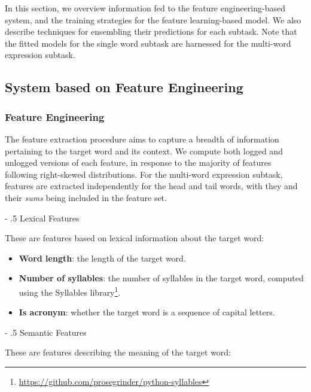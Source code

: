 \documentclass[11pt,a4paper]{article}
\makeatletter
\renewcommand\paragraph{%
    \@startsection{paragraph}{4}{0mm}%
        {-\baselineskip}%
        {.5\baselineskip}%
        {\normalfont\normalsize\bfseries}}
\makeatother
\begin{document}
In this section, we overview information fed to the feature engineering-based system, and the training strategies for the feature learning-based model. We also describe techniques for ensembling their predictions for each subtask. Note that the fitted models for the single word subtask are harnessed for the multi-word expression subtask.

\subsection{System based on Feature Engineering}

\subsubsection{Feature Engineering}

The feature extraction procedure aims to capture a breadth of information pertaining to the target word and its context. We compute both logged and unlogged versions of each feature, in response to the majority of features following right-skewed distributions. For the multi-word expression subtask, features are extracted independently for the head and tail words, with they and their \textit{sums} being included in the feature set.

\paragraph{Lexical Features}

These are features based on lexical information about the target word:

\begin{itemize}
  \item \textbf{Word length}: the length of the target word.
  \item \textbf{Number of syllables}: the number of syllables in the target word, computed using the Syllables library\footnote{\url{https://github.com/prosegrinder/python-syllables}}.
  \item \textbf{Is acronym}: whether the target word is a sequence of capital letters.
\end{itemize}
  
\paragraph{Semantic Features}

These are features describing the meaning of the target word:
\end{document}
